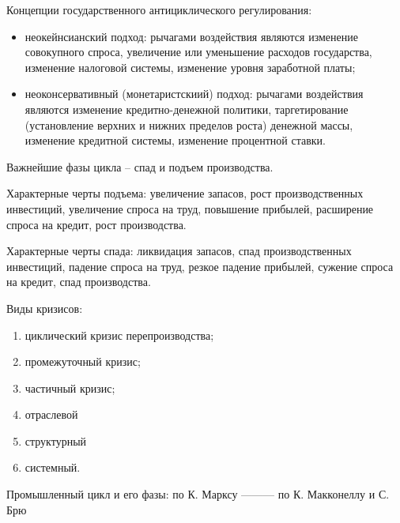 Концепции государственного антициклического регулирования:
\begin{itemize}
    \item неокейнсианский подход: рычагами воздействия являются изменение
    совокупного спроса, увеличение или уменьшение расходов государства,
    изменение налоговой системы, изменение уровня заработной платы;
    \item неоконсервативный (монетаристскиий) подход: рычагами воздействия
    являются изменение кредитно-денежной политики, таргетирование (установление
    верхних и нижних пределов роста) денежной массы, изменение кредитной
    системы, изменение процентной ставки.
\end{itemize}

Важнейшие фазы цикла -- спад и подъем производства.

Характерные черты подъема: увеличение запасов, рост производственных инвестиций,
увеличение спроса на труд, повышение прибылей, расширение спроса на кредит, рост
производства.

Характерные черты спада: ликвидация запасов, спад производственных инвестиций,
падение спроса на труд, резкое падение прибылей, сужение спроса на кредит, спад
производства.

Виды кризисов:
\begin{enumerate}
    \item циклический кризис перепроизводства;
    \item промежуточный кризис;
    \item частичный кризис;
    \item отраслевой
    \item структурный
    \item системный.
\end{enumerate}

Промышленный цикл и его фазы:
по К. Марксу --------- по К. Макконеллу и С. Брю